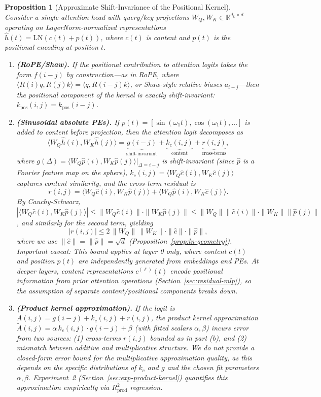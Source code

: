 \documentclass[11pt]{article}
\newtheorem{proposition}[theorem]{Proposition}
\theoremstyle{definition}
\begin{document}
\begin{proposition}[Approximate Shift-Invariance of the Positional Kernel]
\label{prop:approx-shift-invariance}
Consider a single attention head with query/key projections $W_Q, W_K \in \mathbb{R}^{d_k \times d}$ operating on LayerNorm-normalized representations $\hat{h}(t) = \mathrm{LN}(c(t) + p(t))$, where $c(t)$ is content and $p(t)$ is the positional encoding at position $t$.
\begin{enumerate}
    \item[\textup{(a)}] \textbf{(RoPE/Shaw).} If the positional contribution to attention logits takes the form $f(i-j)$ by construction---as in RoPE, where $\langle R(i)q, R(j)k\rangle = \langle q, R(i-j)k\rangle$, or Shaw-style relative biases $a_{i-j}$---then the positional component of the kernel is exactly shift-invariant: $k_{\mathrm{pos}}(i,j) = k_{\mathrm{pos}}(i-j)$.
    \item[\textup{(b)}] \textbf{(Sinusoidal absolute PEs).} If $p(t) = [\sin(\omega_1 t), \cos(\omega_1 t), \ldots]$ is added to content before projection, then the attention logit decomposes as
    \[
        \langle W_Q \hat{h}(i), W_K \hat{h}(j) \rangle = \underbrace{g(i-j)}_{\text{shift-invariant}} + \underbrace{k_c(i,j)}_{\text{content}} + \underbrace{r(i,j)}_{\text{cross-terms}},
    \]
    where $g(\Delta) = \langle W_Q \hat{p}(i), W_K \hat{p}(j) \rangle|_{\Delta = i-j}$ is shift-invariant (since $\hat{p}$ is a Fourier feature map on the sphere), $k_c(i,j) = \langle W_Q \hat{c}(i), W_K \hat{c}(j) \rangle$ captures content similarity, and the cross-term residual is
    \[
    r(i,j) = \langle W_Q \hat{c}(i), W_K \hat{p}(j) \rangle + \langle W_Q \hat{p}(i), W_K \hat{c}(j) \rangle.
    \]
    By Cauchy-Schwarz, $|\langle W_Q \hat{c}(i), W_K \hat{p}(j) \rangle| \leq \|W_Q \hat{c}(i)\| \cdot \|W_K \hat{p}(j)\| \leq \|W_Q\| \|\hat{c}(i)\| \cdot \|W_K\| \|\hat{p}(j)\|$, and similarly for the second term, yielding
    \[
    |r(i,j)| \leq 2\,\|W_Q\|\,\|W_K\| \cdot \|\hat{c}\| \cdot \|\hat{p}\|,
    \]
    where we use $\|\hat{c}\| = \|\hat{p}\| = \sqrt{d}$ (Proposition~\ref{prop:ln-geometry}). \emph{Important caveat:} This bound applies at \emph{layer 0 only}, where content $c(t)$ and position $p(t)$ are independently generated from embeddings and PEs. At deeper layers, content representations $c^{(\ell)}(t)$ encode positional information from prior attention operations (Section~\ref{sec:residual-mlp}), so the assumption of separate content/positional components breaks down.
    \item[\textup{(c)}] \textbf{(Product kernel approximation).} If the logit is $A(i,j) = g(i-j) + k_c(i,j) + r(i,j)$, the product kernel approximation $\tilde{A}(i,j) = \alpha\, k_c(i,j) \cdot g(i-j) + \beta$ (with fitted scalars $\alpha, \beta$) incurs error from two sources: (1) cross-terms $r(i,j)$ bounded as in part (b), and (2) mismatch between additive and multiplicative structure. We do not provide a closed-form error bound for the multiplicative approximation quality, as this depends on the specific distributions of $k_c$ and $g$ and the chosen fit parameters $\alpha, \beta$. Experiment~2 (Section~\ref{sec:exp-product-kernel}) quantifies this approximation empirically via $R^2_{\text{prod}}$ regression.

\end{enumerate}
\end{proposition}
\end{document}
